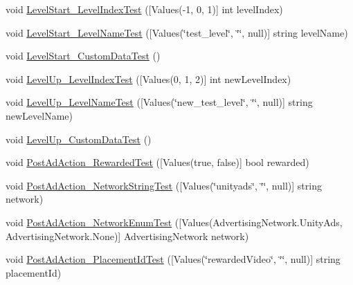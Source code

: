 \begin{DoxyCompactItemize}
\item 
void \mbox{\hyperlink{class_unity_engine_1_1_analytics_1_1_tests_1_1_analytics_event_tests_adc49d05f1cfca2630f0481f4a5ae2363}{Level\+Start\+\_\+\+Level\+Index\+Test}} (\mbox{[}Values(-\/1, 0, 1)\mbox{]} int level\+Index)
\item 
void \mbox{\hyperlink{class_unity_engine_1_1_analytics_1_1_tests_1_1_analytics_event_tests_afe11be707d8d31b0910b7f3621faf7e0}{Level\+Start\+\_\+\+Level\+Name\+Test}} (\mbox{[}Values(\char`\"{}test\+\_\+level\char`\"{}, \char`\"{}\char`\"{}, null)\mbox{]} string level\+Name)
\item 
void \mbox{\hyperlink{class_unity_engine_1_1_analytics_1_1_tests_1_1_analytics_event_tests_af15356afa1959d72ea7f9935f5539139}{Level\+Start\+\_\+\+Custom\+Data\+Test}} ()
\item 
void \mbox{\hyperlink{class_unity_engine_1_1_analytics_1_1_tests_1_1_analytics_event_tests_a28b996d170dd2d0b78cdb9b00d693483}{Level\+Up\+\_\+\+Level\+Index\+Test}} (\mbox{[}Values(0, 1, 2)\mbox{]} int new\+Level\+Index)
\item 
void \mbox{\hyperlink{class_unity_engine_1_1_analytics_1_1_tests_1_1_analytics_event_tests_a1fec0c746eaa0109fa9b7ee13416a52f}{Level\+Up\+\_\+\+Level\+Name\+Test}} (\mbox{[}Values(\char`\"{}new\+\_\+test\+\_\+level\char`\"{}, \char`\"{}\char`\"{}, null)\mbox{]} string new\+Level\+Name)
\item 
void \mbox{\hyperlink{class_unity_engine_1_1_analytics_1_1_tests_1_1_analytics_event_tests_a7053aa2b28d31ff148d6e9bb3eca6ae6}{Level\+Up\+\_\+\+Custom\+Data\+Test}} ()
\item 
void \mbox{\hyperlink{class_unity_engine_1_1_analytics_1_1_tests_1_1_analytics_event_tests_a114ac5d16d011deb22afd094ca46258d}{Post\+Ad\+Action\+\_\+\+Rewarded\+Test}} (\mbox{[}Values(true, false)\mbox{]} bool rewarded)
\item 
void \mbox{\hyperlink{class_unity_engine_1_1_analytics_1_1_tests_1_1_analytics_event_tests_a5070ca2334a07e8307b5ae3dcc133c48}{Post\+Ad\+Action\+\_\+\+Network\+String\+Test}} (\mbox{[}Values(\char`\"{}unityads\char`\"{}, \char`\"{}\char`\"{}, null)\mbox{]} string network)
\item 
void \mbox{\hyperlink{class_unity_engine_1_1_analytics_1_1_tests_1_1_analytics_event_tests_a503cac93e317db44efc059a2666129de}{Post\+Ad\+Action\+\_\+\+Network\+Enum\+Test}} (\mbox{[}Values(Advertising\+Network.\+Unity\+Ads, Advertising\+Network.\+None)\mbox{]} Advertising\+Network network)
\item 
void \mbox{\hyperlink{class_unity_engine_1_1_analytics_1_1_tests_1_1_analytics_event_tests_ab95ae6b11a0e0f18b28fb3ec0f0ed70e}{Post\+Ad\+Action\+\_\+\+Placement\+Id\+Test}} (\mbox{[}Values(\char`\"{}rewarded\+Video\char`\"{}, \char`\"{}\char`\"{}, null)\mbox{]} string placement\+Id)

\end{DoxyCompactItemize}
